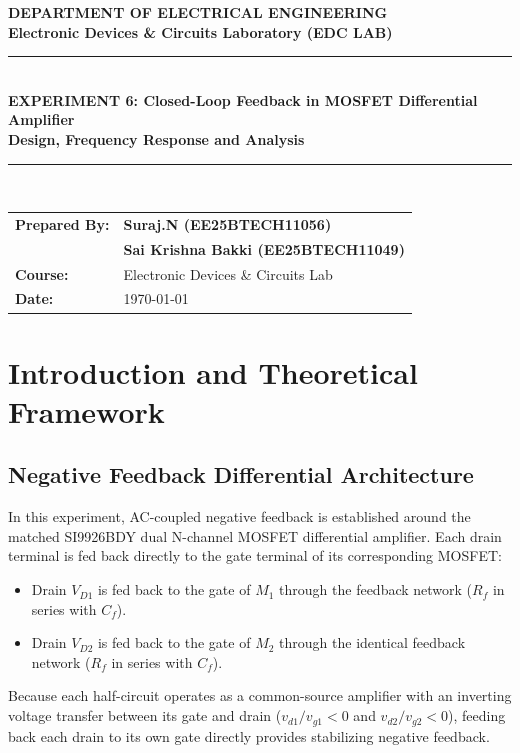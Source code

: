 \documentclass[11pt,a4paper]{article}
\begin{document}
\begin{center}
    {\LARGE \textbf{\color{primary} DEPARTMENT OF ELECTRICAL ENGINEERING}}\\[0.2cm]
    {\large \textbf{Electronic Devices \& Circuits Laboratory (EDC LAB)}}\\[0.4cm]
    \rule{\linewidth}{1pt}\\[0.3cm]
    {\Large \textbf{EXPERIMENT 6: Closed-Loop Feedback in MOSFET Differential Amplifier}}\\[0.1cm]
    {\large \textbf{Design, Frequency Response and Analysis}}\\[0.3cm]
    \rule{\linewidth}{1pt}\\[0.4cm]
    
    \begin{tabular}{ll}
        \textbf{Prepared By:} & \textbf{Suraj.N (EE25BTECH11056)} \\
                              & \textbf{Sai Krishna Bakki (EE25BTECH11049)} \\
        \textbf{Course:}      & Electronic Devices \& Circuits Lab \\
        \textbf{Date:}        & \today
    \end{tabular}
\end{center}

\vspace{0.1cm}

\section{Introduction and Theoretical Framework}

\subsection{Negative Feedback Differential Architecture}
In this experiment, AC-coupled negative feedback is established around the matched SI9926BDY dual N-channel MOSFET differential amplifier. Each drain terminal is fed back directly to the gate terminal of its corresponding MOSFET:
\begin{itemize}
    \item Drain $V_{D1}$ is fed back to the gate of $M_1$ through the feedback network ($R_f$ in series with $C_f$).
    \item Drain $V_{D2}$ is fed back to the gate of $M_2$ through the identical feedback network ($R_f$ in series with $C_f$).
\end{itemize}
Because each half-circuit operates as a common-source amplifier with an inverting voltage transfer between its gate and drain ($v_{d1}/v_{g1} < 0$ and $v_{d2}/v_{g2} < 0$), feeding back each drain to its own gate directly provides stabilizing negative feedback. 
\end{document}
